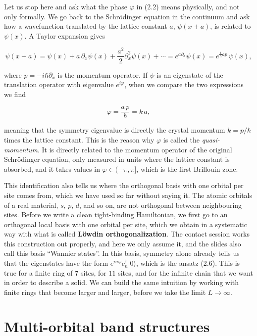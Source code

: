 Let us stop here and ask what the phase $\varphi$ in (2.2) means physically, and not only formally.
We go back to the Schrödinger equation in the continuum and ask how a wavefunction translated by the
lattice constant $a$, $\psi(x+a)$, is related to $\psi(x)$. A Taylor expansion gives

\begin{equation*}\psi(x+a) = \psi(x) + a\,\partial_x\psi(x) + \frac{a^2}{2}\partial_x^2\psi(x) + \cdots
= e^{a\partial_x}\psi(x) = e^{\frac{i}{\hbar}ap}\,\psi(x),\end{equation*}

where $p=-i\hbar\partial_x$ is the momentum operator. If $\psi$ is an eigenstate of the translation
operator with eigenvalue $e^{i\varphi}$, when we compare the two expressions we find

\begin{equation}\varphi = \frac{a\,p}{\hbar} = k\,a,\end{equation}

meaning that the symmetry eigenvalue is directly the crystal momentum $k=p/\hbar$ times the lattice
constant. This is the reason why $\varphi$ is called the \emph{quasi-momentum}. It is directly
related to the momentum operator of the original Schrödinger equation, only measured in units where
the lattice constant is absorbed, and it takes values in $\varphi\in(-\pi,\pi]$, which is the first
Brillouin zone.

This identification also tells us where the orthogonal basis with one orbital per site comes from,
which we have used so far without saying it. The atomic orbitals of a real material, $s$, $p$, $d$,
and so on, are not orthogonal between neighbouring sites. Before we write a clean tight-binding
Hamiltonian, we first go to an orthogonal local basis with one orbital per site, which we obtain in a
systematic way with what is called \textbf{Löwdin orthogonalization}. The contact session works this
construction out properly, and here we only assume it, and the slides also call this basis ``Wannier
states''. In this basis, symmetry alone already tells us that the eigenstates have the form
$e^{in\varphi}c_n^\dagger|0\rangle$, which is the ansatz (2.6). This is true for a finite ring of $7$
sites, for $11$ sites, and for the infinite chain that we want in order to describe a solid. We can
build the same intuition by working with finite rings that become larger and larger, before we take
the limit $L\to\infty$.

\section{Multi-orbital band structures}

